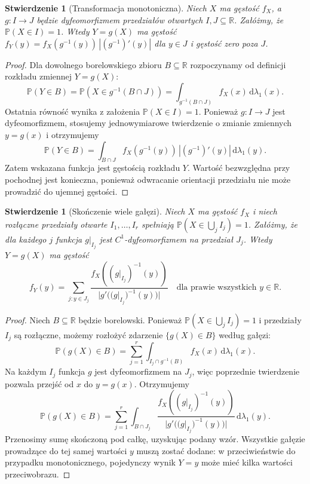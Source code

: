 \documentclass[11pt,a4paper,oneside]{report}
\numberwithin{equation}{chapter}
\theoremstyle{plain}
\newtheorem{stwierdzenie}[twierdzenie]{Stwierdzenie}
\theoremstyle{definition}
\theoremstyle{remark}
\newcommand{\R}{\mathbb{R}}
\newcommand{\Prob}{\mathbb{P}}
\newcommand{\dd}{\mathrm{d}}
\begin{document}
\begin{stwierdzenie}[Transformacja monotoniczna]
Niech $X$ ma gęstość $f_X$, a $g:I\to J$ będzie dyfeomorfizmem
przedziałów otwartych $I,J\subseteq\R$. Załóżmy, że
$\Prob(X\in I)=1$. Wtedy $Y=g(X)$ ma gęstość
$f_Y(y)=f_X(g^{-1}(y))\,|(g^{-1})'(y)|$ dla $y\in J$
i gęstość zero poza $J$.
\end{stwierdzenie}
\begin{proof}
Dla dowolnego borelowskiego zbioru $B\subseteq\R$
rozpoczynamy od definicji rozkładu zmiennej $Y=g(X)$:
\[
\Prob(Y\in B)=\Prob(X\in g^{-1}(B\cap J))
=\int_{g^{-1}(B\cap J)}f_X(x)\,\dd\lambda_1(x).
\]
Ostatnia równość wynika z założenia $\Prob(X\in I)=1$.
Ponieważ $g:I\to J$ jest dyfeomorfizmem, stosujemy
jednowymiarowe twierdzenie o zmianie zmiennych
$y=g(x)$ i otrzymujemy
\[
\Prob(Y\in B)=\int_{B\cap J}
 f_X(g^{-1}(y))\,|(g^{-1})'(y)|\,\dd\lambda_1(y).
\]
Zatem wskazana funkcja jest gęstością rozkładu $Y$.
Wartość bezwzględna przy pochodnej jest konieczna,
ponieważ odwracanie orientacji przedziału nie może
prowadzić do ujemnej gęstości.
\end{proof}

\begin{stwierdzenie}[Skończenie wiele gałęzi]
Niech $X$ ma gęstość $f_X$ i niech rozłączne przedziały otwarte
$I_1,\ldots,I_r$ spełniają $\Prob(X\in\bigcup_jI_j)=1$.
Załóżmy, że dla każdego $j$ funkcja $g|_{I_j}$ jest
$C^1$-dyfeomorfizmem na przedział $J_j$.
Wtedy $Y=g(X)$ ma gęstość
\[
f_Y(y)=\sum_{j:y\in J_j}
\frac{f_X((g|_{I_j})^{-1}(y))}
{|g'((g|_{I_j})^{-1}(y))|}
\quad\text{dla prawie wszystkich }y\in\R.
\]
\end{stwierdzenie}
\begin{proof}
Niech $B\subseteq\R$ będzie borelowski. Ponieważ
$\Prob(X\in\bigcup_j I_j)=1$ i przedziały $I_j$
są rozłączne, możemy rozłożyć zdarzenie $\{g(X)\in B\}$
według gałęzi:
\[
\Prob(g(X)\in B)=\sum_{j=1}^r
\int_{I_j\cap g^{-1}(B)} f_X(x)\,\dd\lambda_1(x).
\]
Na każdym $I_j$ funkcja $g$ jest dyfeomorfizmem
na $J_j$, więc poprzednie twierdzenie pozwala
przejść od $x$ do $y=g(x)$. Otrzymujemy
\[
\Prob(g(X)\in B)=\sum_{j=1}^r
\int_{B\cap J_j}
\frac{f_X((g|_{I_j})^{-1}(y))}
{|g'((g|_{I_j})^{-1}(y))|}\,\dd\lambda_1(y).
\]
Przenosimy sumę skończoną pod całkę, uzyskując
podany wzór. Wszystkie gałęzie prowadzące do tej samej
wartości $y$ muszą zostać dodane: w przeciwieństwie
do przypadku monotonicznego, pojedynczy wynik $Y=y$
może mieć kilka wartości przeciwobrazu.
\end{proof}
\end{document}
